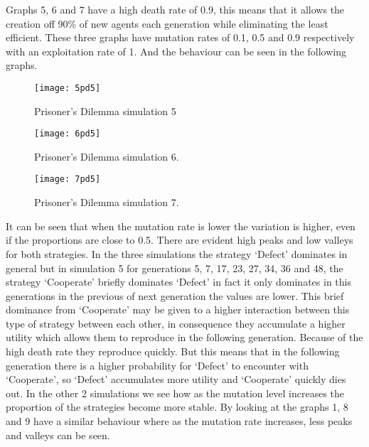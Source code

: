 \documentclass{book}
\begin{document}
Graphs 5, 6 and 7  have a high death rate of 0.9, this means that it allows the creation off 90\% of new agents each generation while eliminating the least efficient. These three graphs have mutation rates of 0.1, 0.5 and 0.9 respectively with an exploitation rate of 1. And the behaviour can be seen in the following graphs.

\begin{figure}[H]
\begin{center}
	\texttt{[image: 5pd5]}
	
\caption{ Prisoner's Dilemma simulation 5}
\label{fig:pds5}	
\end{center}
\end{figure}

\begin{figure}[H]
\begin{center}
	\texttt{[image: 6pd5]}
	
\caption{Prisoner's Dilemma simulation 6.}
\label{fig:pds6}	
\end{center}
\end{figure}

\begin{figure}[H]
\begin{center}
	\texttt{[image: 7pd5]}

\caption{ Prisoner's Dilemma simulation 7.}
\label{fig:pds7}	
\end{center}
\end{figure}

It can be seen that when the mutation rate is lower the variation is higher, even if the proportions are close to 0.5. There are evident high peaks and low valleys  for both strategies. In the three simulations the strategy `Defect' dominates in general but in simulation 5  for generations 5, 7, 17, 23, 27, 34, 36 and 48, the strategy `Cooperate' briefly dominates `Defect' in fact it only dominates in this generations in the previous of next generation the values are lower. This brief dominance from `Cooperate' may be given to a higher interaction between this type of strategy between each other, in consequence they accumulate a higher utility which allows them to reproduce in the following generation. Because of the high death rate they reproduce quickly. But this means that in the following generation there is a higher probability for `Defect' to encounter with `Cooperate', so `Defect' accumulates more utility and  `Cooperate' quickly dies out. In the other 2 simulations we see how as the mutation level increases the proportion of the strategies become more stable. By looking at the graphs 1, 8 and 9 have a similar behaviour where as the mutation rate increases, less peaks and valleys can be seen.
\end{document}
